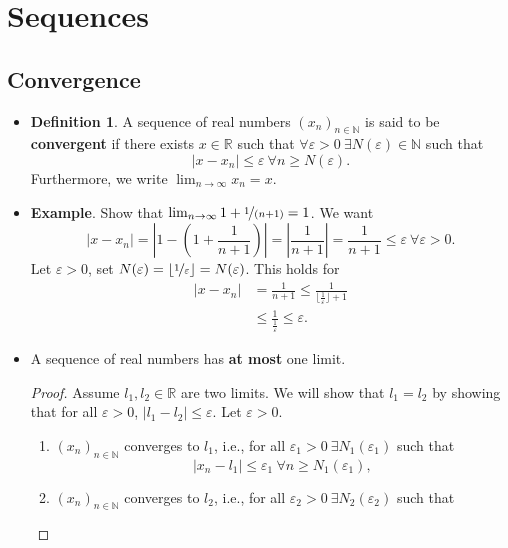 \documentclass{article}
\newcommand{\R}{\mathbb{R}}
\newcommand{\N}{\mathbb{N}}
\newcommand{\seq}[2]{(#1_{#2})_{#2 \in \N}}
\newcommand{\?}{\stackrel{?}{=}}
\theoremstyle{definition} %
\newtheorem{definition}[subsection]{Definition} %
\begin{document}
\section{Sequences}

\subsection{Convergence}

\begin{itemize}
    \item[]
    \begin{definition}
        A sequence of real numbers $\seq{x}{n}$ is said to be \textbf{convergent} if there exists $x \in \R$ such that $\forall \varepsilon > 0 \ \exists N(\varepsilon) \in \N$ such that
    $$|x - x_n| \leq \varepsilon \ \forall n \geq N(\varepsilon).$$
    Furthermore, we write $\lim_{n \to \infty} x_n = x$.
    \end{definition}
    \item \textbf{Example}. Show that $\lim_{n \to \infty} 1 + \nicefrac{1}{(n + 1)} = 1$. We want
    $$|x - x_n| = \left|1 - \left(1 + \frac{1}{n + 1}\right)\right| = \left|\frac{1}{n + 1}\right| = \frac{1}{n + 1} \leq \varepsilon \ \forall \varepsilon > 0.$$
    Let $\varepsilon > 0$, set $N(\varepsilon) = \lfloor \nicefrac{1}{\varepsilon} \rfloor = N(\varepsilon)$. This holds for
    \begin{align*}
        |x - x_n| &= \frac{1}{n + 1} \leq \frac{1}{\lfloor \frac{1}{\varepsilon} \rfloor + 1} \\
        &\leq \frac{1}{\frac{1}{\varepsilon}} \leq \varepsilon.
    \end{align*}
    \item[]
    \begin{lemma}
        A sequence of real numbers has \textbf{at most} one limit.
    \end{lemma}
    \begin{proof}
        Assume $l_1, l_2 \in \R$ are two limits. We will show that $l_1 = l_2$ by showing that for all $\varepsilon > 0$, $|l_1 - l_2| \leq \varepsilon$. Let $\varepsilon > 0$.
        \begin{enumerate}[label=(\arabic*)]
            \item $\seq{x}{n}$ converges to $l_1$, i.e., for all $\varepsilon_1 > 0 \ \exists N_1(\varepsilon_1)$ such that
            $$|x_n - l_1| \leq \varepsilon_1 \ \forall n \geq N_1(\varepsilon_1),$$
            \item $\seq{x}{n}$ converges to $l_2$, i.e., for all $\varepsilon_2 > 0 \ \exists N_2(\varepsilon_2)$ such that

\end{enumerate}
\end{proof}
\end{itemize}
\end{document}
